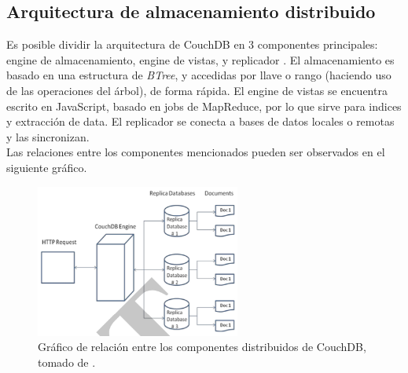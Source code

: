 \documentclass{article}
\begin{document}
        \subsection{Arquitectura de almacenamiento distribuido}
            Es posible dividir la arquitectura de CouchDB en 3 componentes principales: engine de almacenamiento, engine de vistas, y replicador \cite{padhy}. El almacenamiento es basado en una estructura de \textit{BTree}, y accedidas por llave o rango (haciendo uso de las operaciones del árbol), de forma rápida. El engine de vistas se encuentra escrito en JavaScript, basado en jobs de MapReduce, por lo que sirve para indices y extracción de data. El replicador se conecta a bases de datos locales o remotas y las sincronizan. \\
            Las relaciones entre los componentes mencionados pueden ser observados en el siguiente gráfico. \\
            \begin{figure}[h]
                \caption{Gráfico de relación entre los componentes distribuidos de CouchDB, tomado de \cite{padhy}.}
                \includegraphics[width = 0.6\textwidth]{architecture.png}
            \end{figure}
\end{document}
